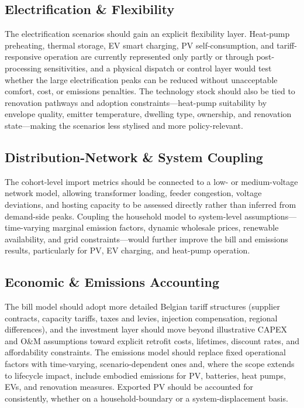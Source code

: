 \subsection{Electrification \& Flexibility}
\label{sec:futureworkElectrification}

The electrification scenarios should gain an explicit flexibility layer.
Heat-pump preheating, thermal storage, EV smart charging, PV self-consumption,
and tariff-responsive operation are currently represented only partly or through
post-processing sensitivities, and a physical dispatch or control layer would
test whether the large electrification peaks can be reduced without unacceptable
comfort, cost, or emissions penalties. The technology stock should also be tied
to renovation pathways and adoption constraints---heat-pump suitability by
envelope quality, emitter temperature, dwelling type, ownership, and renovation
state---making the scenarios less stylised and more policy-relevant.


\subsection{Distribution-Network \& System Coupling}
\label{sec:futureworkGrid}

The cohort-level import metrics should be connected to a low- or medium-voltage
network model, allowing transformer loading, feeder congestion, voltage
deviations, and hosting capacity to be assessed directly rather than inferred
from demand-side peaks. Coupling the household model to system-level
assumptions---time-varying marginal emission factors, dynamic wholesale prices,
renewable availability, and grid constraints---would further improve the bill
and emissions results, particularly for PV, EV charging, and heat-pump
operation.


\subsection{Economic \& Emissions Accounting}
\label{sec:futureworkEconomicsEmissions}

The bill model should adopt more detailed Belgian tariff structures (supplier
contracts, capacity tariffs, taxes and levies, injection compensation, regional
differences), and the investment layer should move beyond illustrative CAPEX and
O\&M assumptions toward explicit retrofit costs, lifetimes, discount rates, and
affordability constraints. The emissions model should replace fixed operational
factors with time-varying, scenario-dependent ones and, where the scope extends
to lifecycle impact, include embodied emissions for PV, batteries, heat pumps,
EVs, and renovation measures. Exported PV should be accounted for consistently,
whether on a household-boundary or a system-displacement basis.


